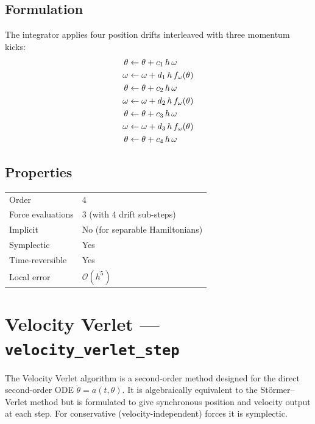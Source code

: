\documentclass[11pt,a4paper]{article}
\newcommand{\bigO}{\mathcal{O}}
\begin{document}
\subsection{Formulation}

The integrator applies four position drifts interleaved with three momentum
kicks:
\begin{align}
  \theta &\leftarrow \theta + c_1\,h\,\omega \notag\\
  \omega &\leftarrow \omega + d_1\,h\,f_\omega(\theta) \notag\\
  \theta &\leftarrow \theta + c_2\,h\,\omega \notag\\
  \omega &\leftarrow \omega + d_2\,h\,f_\omega(\theta) \notag\\
  \theta &\leftarrow \theta + c_3\,h\,\omega \notag\\
  \omega &\leftarrow \omega + d_3\,h\,f_\omega(\theta) \notag\\
  \theta &\leftarrow \theta + c_4\,h\,\omega
  \label{eq:ruth4}
\end{align}

\subsection{Properties}
\begin{center}
\begin{tabular}{ll}
  \hline
  Order             & 4 \\
  Force evaluations & 3 (with 4 drift sub-steps) \\
  Implicit          & No (for separable Hamiltonians) \\
  Symplectic        & Yes \\
  Time-reversible   & Yes \\
  Local error       & $\bigO(h^5)$ \\
  \hline
\end{tabular}
\end{center}

\section{Velocity Verlet --- \texttt{velocity\_verlet\_step}}
\label{sec:vv}

The Velocity Verlet algorithm is a second-order method designed for the direct
second-order ODE $\ddot\theta = a(t,\theta)$. It is algebraically equivalent to
the St\"{o}rmer--Verlet method but is formulated to give synchronous position and
velocity output at each step. For conservative (velocity-independent) forces it
is symplectic.
\end{document}
